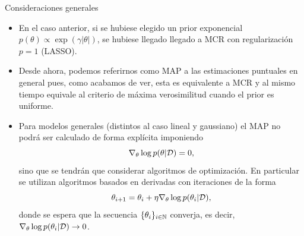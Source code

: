 \documentclass[9pt]{beamer}
\begin{document}
\begin{frame}{Consideraciones generales}

\begin{itemize}
	\item En el caso anterior, si se hubiese elegido un prior exponencial $p(\theta)\propto\exp(\gamma|\theta|)$, se hubiese llegado llegado a MCR con regularización $p=1$ (LASSO).\pause
	\item Desde ahora, podemos referirnos como MAP a las estimaciones puntuales en general pues, como acabamos de ver, esta es equivalente a MCR y al mismo tiempo equivale al criterio de máxima verosimilitud cuando el prior es uniforme.\pause
	\item Para modelos generales (distintos al caso lineal y gaussiano) el MAP no podrá ser calculado de forma explícita imponiendo 
\begin{equation*}
 	\nabla_\theta  \log p(\theta|{\mathcal D}) = 0,
 \end{equation*}
 sino que se tendrán que considerar algoritmos de optimización. En particular se utilizan algoritmos basados en derivadas con iteraciones de la forma
 \begin{equation*}
 	\theta_{i+1} = \theta_i + \eta \nabla_\theta  \log p(\theta_i|{\mathcal D}), \label{eq:itera_MAP_grad}
 \end{equation*}
 donde se espera que la secuencia $\{\theta_i\}_{i\in{\mathbb N}}$ converja, es decir, $\nabla_\theta  \log p(\theta_i|{\mathcal D}) \to 0$.
\end{itemize}

\end{frame}
\end{document}
